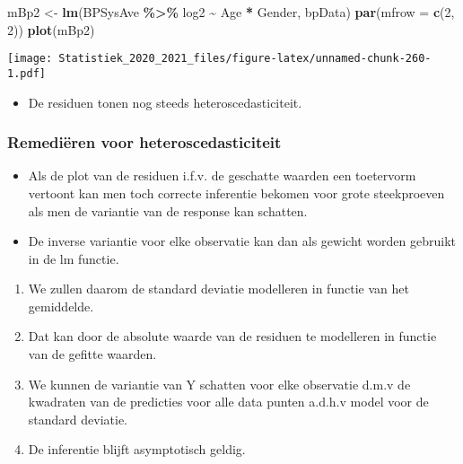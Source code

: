 \documentclass[
  12pt,dutch,coursenotes]{book}
\newenvironment{Shaded}{\begin{snugshade}}{\end{snugshade}}
\newcommand{\DataTypeTok}[1]{\textcolor[rgb]{0.13,0.29,0.53}{#1}}
\newcommand{\DecValTok}[1]{\textcolor[rgb]{0.00,0.00,0.81}{#1}}
\newcommand{\KeywordTok}[1]{\textcolor[rgb]{0.13,0.29,0.53}{\textbf{#1}}}
\newcommand{\NormalTok}[1]{#1}
\newcommand{\OperatorTok}[1]{\textcolor[rgb]{0.81,0.36,0.00}{\textbf{#1}}}
\newcommand{\StringTok}[1]{\textcolor[rgb]{0.31,0.60,0.02}{#1}}
\providecommand{\tightlist}{%
  \setlength{\itemsep}{0pt}\setlength{\parskip}{0pt}}
\theoremstyle{definition}
\theoremstyle{definition}
\theoremstyle{definition}
\theoremstyle{remark}
\begin{document}
\begin{Shaded}
\begin{Highlighting}[]
\NormalTok{mBp2 \textless{}{-}}\StringTok{ }\KeywordTok{lm}\NormalTok{(BPSysAve }\OperatorTok{\%\textgreater{}\%}\StringTok{ }\NormalTok{log2 }\OperatorTok{\textasciitilde{}}\StringTok{ }\NormalTok{Age }\OperatorTok{*}\StringTok{ }\NormalTok{Gender, bpData)}
\KeywordTok{par}\NormalTok{(}\DataTypeTok{mfrow =} \KeywordTok{c}\NormalTok{(}\DecValTok{2}\NormalTok{, }\DecValTok{2}\NormalTok{))}
\KeywordTok{plot}\NormalTok{(mBp2)}
\end{Highlighting}
\end{Shaded}

\texttt{[image: Statistiek\_2020\_2021\_files/figure-latex/unnamed-chunk-260-1.pdf]}

\begin{itemize}
\tightlist
\item
  De residuen tonen nog steeds heteroscedasticiteit.
\end{itemize}

\hypertarget{remediuxebren-voor-heteroscedasticiteit}{%
\subsubsection{Remediëren voor heteroscedasticiteit}\label{remediuxebren-voor-heteroscedasticiteit}}

\begin{itemize}
\tightlist
\item
  Als de plot van de residuen i.f.v. de geschatte waarden een toetervorm vertoont kan men toch correcte inferentie bekomen voor grote steekproeven als men de variantie van de response kan schatten.
\item
  De inverse variantie voor elke observatie kan dan als gewicht worden gebruikt in de lm functie.
\end{itemize}

\begin{enumerate}
\def\labelenumi{\arabic{enumi}.}
\tightlist
\item
  We zullen daarom de standard deviatie modelleren in functie van het gemiddelde.
\item
  Dat kan door de absolute waarde van de residuen te modelleren in functie van de gefitte waarden.
\item
  We kunnen de variantie van Y schatten voor elke observatie d.m.v de kwadraten van de predicties voor alle data punten a.d.h.v model voor de standard deviatie.
\item
  De inferentie blijft asymptotisch geldig.
\end{enumerate}
\end{document}
